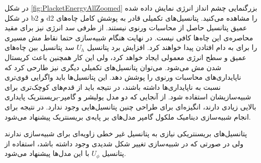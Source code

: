 در شکل 
\ref{fig:PlacketEnergyAllZoomed}
بزرگنمایی چشم انداز انرژی نمایش داده شده در شکل
\label{fig:PlacketEnergyAll}b2
و
d2
را مشاهده می‌کنید. پتانسیل‌های تکمیلی قادر به پوشش کامل چاه‌های عمیق پتانسیل حاصل از محاسبات ورنوی نیستند. از طرفی سد انرژی نیز برای مقید محاصره‌ی این چاه‌ها کافی نیست. در نهایت هنگام شبیه‌سازی حتما نقاط مش مسیری را برای به دام افتادن پیدا خواهند کرد.  افزایش برد پتانسیل
$U_h$
سد پتانسیل بین چاه‌های عمیق و سطح انرژی معمولی ایجاد خواهد کرد، ولی این کار همچنین باعث کریستال شدن مش می‌شود. می‌توان پتانسیل‌های تکمیلی دیگری نیز طارحی کرد که ناپایداری‌های محاسبات ورنوی را پوشش دهد. این پتانسیل‌ها باید واگرایی قوی‌تری نسبت به ناپایداری‌ها داشته باشند، در نتیجه باید از قدم‌های کوچک‌تری برای شبیه‌سازیشان استفاده شود. از آنجایی که دو مدل یولیشر و گامپر-بریسنتریک پایداری بالایی زیادی دارند، انگیزه‌ای برای طراحی چنین پتانسیل‌هایی وجود ندارد. در نتیجه برای انجام شبیه‌سازی دینامیک ملکول گامپر مدل‌های بر پایه‌ی بریسنتریک پیشنهاد می‌شود. 

پتانسیل‌های بریسنتریکی نیازی به پتانسیل‌ غیر خطی زاویه‌ای برای شبیه‌سازی ندارند ولی در صورتی که در شبیه‌سازی تغییر شکل شدیدی وجود داشته باشد، استفاده از پتانسیل
$U_\phi$
با این مدل‌ها پیشنهاد می‌شود.








